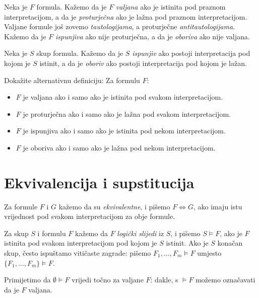 \begin{definicija}
Neka je $F$ formula. Kažemo da je $F$ \emph{valjana} ako je istinita pod praznom interpretacijom, a da je \emph{proturječna} ako je lažna pod praznom interpretacijom. Valjane formule još zovemo \emph{tautologijama}, a proturječne \emph{antitautologijama}. Kažemo da je $F$ \emph{ispunjiva} ako nije proturječna, a da je \emph{oboriva} ako nije valjana.

Neka je $S$ skup formula. Kažemo da je $S$ \emph{ispunjiv} ako postoji interpretacija pod kojom je $S$ istinit, a da je \emph{oboriv} ako postoji interpretacija pod kojom je lažan.
\end{definicija}

\begin{zadatak}
Dokažite alternativnu definiciju: Za formulu $F$:
\begin{itemize}
\item $F$ je valjana ako i samo ako je istinita pod svakom interpretacijom.
\item $F$ je proturječna ako i samo ako je lažna pod svakom interpretacijom.
\item $F$ je ispunjiva ako i samo ako je istinita pod nekom interpretacijom.
\item $F$ je oboriva ako i samo ako je lažna pod nekom interpretacijom.
\end{itemize}
\end{zadatak}

\section{Ekvivalencija i supstitucija}

\begin{definicija}
Za formule $F$ i $G$ kažemo da su \emph{ekvivalentne}, i pišemo $F\Leftrightarrow G$, ako imaju istu vrijednost pod svakom interpretacijom za obje formule.

Za skup $S$ i formulu $F$ kažemo da $F$ \emph{logički slijedi} iz $S$, i pišemo $S\models F$, ako je $F$ istinita pod svakom interpretacijom pod kojom je $S$ istinit. Ako je $S$ konačan skup, često ispuštamo vitičaste zagrade: pišemo $F_1,\ldots,F_m\models F$ umjesto $\{F_1,\ldots,F_m\}\models F$.
\end{definicija}

Primijetimo da $\emptyset\models F$ vrijedi točno za valjane $F$: dakle, s $\models F$ možemo označavati da je $F$ valjana.

